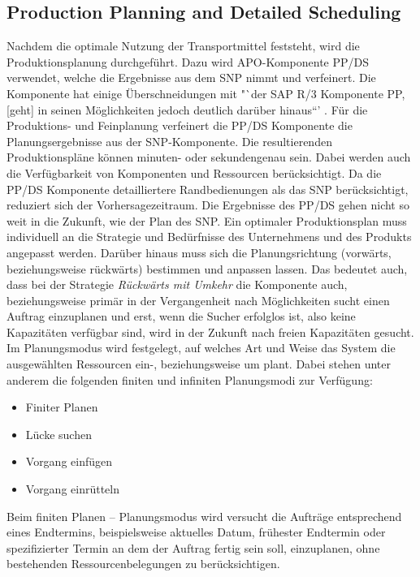 \subsection{Production Planning and Detailed Scheduling}
Nachdem die optimale Nutzung der Transportmittel feststeht, wird die Produktionsplanung durchgeführt. Dazu wird \ac{APO}-Komponente \ac{PP/DS} verwendet, welche die Ergebnisse aus dem \ac{SNP} nimmt und verfeinert.
Die Komponente hat einige Überschneidungen mit "`der SAP R/3 Komponente PP, [geht] in seinen Möglichkeiten jedoch deutlich darüber hinaus“' \cite[Abschnitt 4.3.4, Seite 11]{scm:script_17_1}. 
Für die Produktions- und Feinplanung verfeinert die \ac{PP/DS} Komponente die Planungsergebnisse aus der \ac{SNP}-Komponente. Die resultierenden Produktionspläne können minuten- oder sekundengenau sein. Dabei werden auch die Verfügbarkeit von Komponenten und Ressourcen berücksichtigt. Da die \ac{PP/DS} Komponente detailliertere Randbedienungen als das \ac{SNP} berücksichtigt, reduziert sich der Vorhersagezeitraum. Die Ergebnisse des \ac{PP/DS} gehen nicht so weit in die Zukunft, wie der Plan des \ac{SNP}. \cite[Abschnitt 4.3.4, Seite 11]{scm:script_17_1}
Ein optimaler Produktionsplan muss individuell an die Strategie und Bedürfnisse des Unternehmens und des Produkts angepasst werden. Darüber hinaus muss sich die Planungsrichtung (vorwärts, beziehungsweise rückwärts) bestimmen und anpassen lassen. Das bedeutet auch, dass bei der Strategie \textit{Rückwärts mit Umkehr} die Komponente auch, beziehungsweise primär in der Vergangenheit nach Möglichkeiten sucht einen Auftrag einzuplanen und erst, wenn die Sucher erfolglos ist, also keine Kapazitäten verfügbar sind, wird in der Zukunft nach freien Kapazitäten gesucht.
Im Planungsmodus wird festgelegt, auf welches Art und Weise das System die ausgewählten Ressourcen ein-, beziehungsweise um plant. Dabei stehen unter anderem die folgenden finiten und infiniten Planungsmodi zur Verfügung: \cite[Abschnitt 4.3.4, Seite 11f]{scm:script_17_1}\cite{scm:planungsmode_9}
\begin{itemize}
	\item Finiter Planen
	\item Lücke suchen
	\item Vorgang einfügen
	\item Vorgang einrütteln
\end{itemize}
Beim finiten Planen – Planungsmodus wird versucht die Aufträge entsprechend eines Endtermins, beispielsweise aktuelles Datum, frühester Endtermin oder spezifizierter Termin an dem der Auftrag fertig sein soll, einzuplanen, ohne bestehenden Ressourcenbelegungen zu berücksichtigen. 

